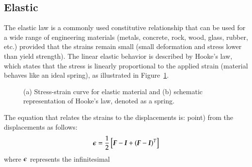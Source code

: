 \subsection{Elastic} The elastic law is a
commonly used constitutive relationship that can be used for a wide
range of engineering materials (\eg metals, concrete, rock, wood,
glass, rubber, etc.) provided that the strains remain small (\ie small
deformation and stress lower than yield strength). The linear elastic
behavior is described by Hooke's law, which states that the stress is
linearly proportional to the applied strain (material behaves like an
ideal spring), as illustrated in Figure~\ref{fig:smm:cl:elastic}.
\begin{figure}[!htb]
  \begin{center}

\hspace{0.05\textwidth} 
    \caption{(a) Stress-strain curve for elastic material and (b)
schematic representation of Hooke's law, denoted as a spring.}
    \label{fig:smm:cl:elastic}
  \end{center}
\end{figure} The equation that relates the strains to the
displacements is: %
point) from the displacements as follows:
\begin{equation}\label{eqn:smm:strain_inf} \boldsymbol{\epsilon} =
\frac{1}{2} \left[ \boldsymbol{F}-\boldsymbol{I}+(\boldsymbol{F}-\boldsymbol{I})^T \right]
\end{equation} where $\boldsymbol{\epsilon}$ represents the infinitesimal
